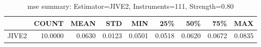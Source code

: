 \begin{table}[ht]
\centering
\caption{mse summary: Estimator=JIVE2, Instruments=111, Strength=0.80}
\begin{tabular}{lrrrrrrrr}
\toprule
 & COUNT & MEAN & STD & MIN & 25\% & 50\% & 75\% & MAX \\
\midrule
JIVE2 & 10.0000 & 0.0630 & 0.0123 & 0.0501 & 0.0518 & 0.0620 & 0.0672 & 0.0835 \\
\bottomrule
\end{tabular}
\end{table}
